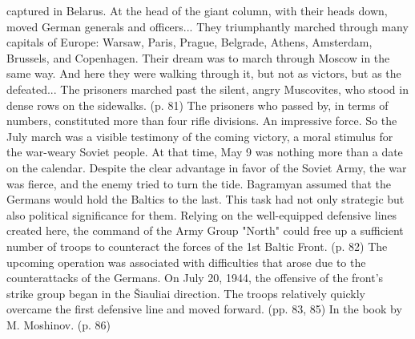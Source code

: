 {
captured in Belarus. At the head of the giant column, with their heads down, moved German generals and officers... They triumphantly marched through many capitals of Europe: Warsaw, Paris, Prague, Belgrade, Athens, Amsterdam, Brussels, and Copenhagen. Their dream was to march through Moscow in the same way. And here they were walking through it, but not as victors, but as the defeated... The prisoners marched past the silent, angry Muscovites, who stood in dense rows on the sidewalks. (p. 81) The prisoners who passed by, in terms of numbers, constituted more than four rifle divisions. An impressive force. So the July march was a visible testimony of the coming victory, a moral stimulus for the war-weary Soviet people. At that time, May 9 was nothing more than a date on the calendar. Despite the clear advantage in favor of the Soviet Army, the war was fierce, and the enemy tried to turn the tide. Bagramyan assumed that the Germans would hold the Baltics to the last. This task had not only strategic but also political significance for them. Relying on the well-equipped defensive lines created here, the command of the Army Group "North" could free up a sufficient number of troops to counteract the forces of the 1st Baltic Front. (p. 82) The upcoming operation was associated with difficulties that arose due to the counterattacks of the Germans. On July 20, 1944, the offensive of the front's strike group began in the Šiauliai direction. The troops relatively quickly overcame the first defensive line and moved forward. (pp. 83, 85) In the book by M. Moshinov. (p. 86)}

